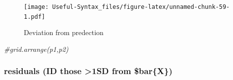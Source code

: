 \documentclass[
]{article}
\newenvironment{Shaded}{\begin{snugshade}}{\end{snugshade}}
\newcommand{\CommentTok}[1]{\textcolor[rgb]{0.56,0.35,0.01}{\textit{#1}}}
\begin{document}
\begin{figure}
\centering
\texttt{[image: Useful-Syntax\_files/figure-latex/unnamed-chunk-59-1.pdf]}
\caption{\label{fig:unnamed-chunk-59}Deviation from predection}
\end{figure}

\begin{Shaded}
\begin{Highlighting}[]
\CommentTok{\#grid.arrange(p1,p2)}
\end{Highlighting}
\end{Shaded}

\hypertarget{residuals-id-those-1sd-from-barx}{%
\subsubsection{residuals (ID those \textgreater1SD from \$bar\{X\})}\label{residuals-id-those-1sd-from-barx}}
\end{document}
